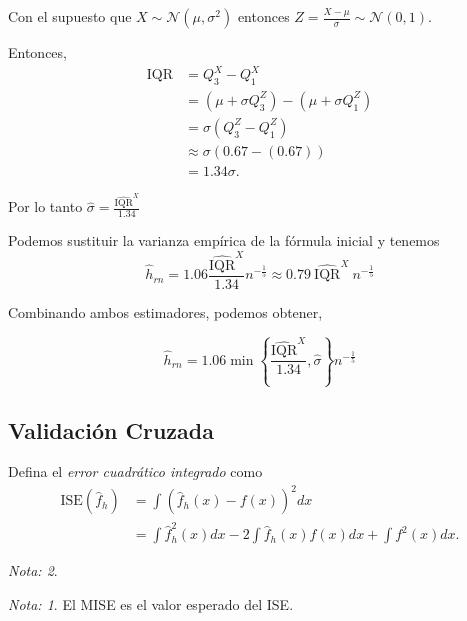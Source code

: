 \documentclass[
  12pt,
]{book}
\theoremstyle{definition}
\theoremstyle{definition}
\theoremstyle{definition}
\theoremstyle{remark}
\newtheorem*{remark}{Nota: }
\begin{document}
Con el supuesto que \(X\sim \mathcal{N}(\mu,\sigma^{2})\) entonces \(\displaystyle Z = \frac{X-\mu}{\sigma} \sim \mathcal{N}(0,1)\).

Entonces,
\begin{align*}
\mathrm{IQR}
& = Q^{X}_{3} - Q^{X}_{1}                                                     \\
& = \left( \mu+\sigma Q^{Z}_{3} \right) - \left( \mu+\sigma Q^{Z}_{1} \right) \\
& = \sigma \left(Q^{Z}_{3} - Q^{Z}_{1} \right)                                \\
& \approx \sigma \left( 0.67 - (0.67) \right)                                 \\
& =1.34 \sigma.
\end{align*}

Por lo tanto \(\displaystyle \hat{\sigma} = \frac{\widehat{\mathrm{IQR}}^{X}}{1.34}\)

Podemos sustituir la varianza empírica de la fórmula inicial y tenemos
\begin{equation*}
\hat{h}_{rn} = 1.06 \frac{\widehat{\mathrm{IQR}}^{X}}{1.34} n^{-\frac{1}{5}} \approx 0.79\  \widehat{\mathrm{IQR}}^{X}\ n^{-\frac{1}{5}}
\end{equation*}

Combinando ambos estimadores, podemos obtener,

\begin{equation*}
\hat{h}_{rn} = 1.06 \min \left\{\frac{\widehat{\mathrm{IQR}}^{X}}{1.34}, \hat{\sigma }\right\} n^{-\frac{1}{5}}
\end{equation*}

\hypertarget{validaciuxf3n-cruzada}{%
\subsection{Validación Cruzada}\label{validaciuxf3n-cruzada}}

Defina el \emph{error cuadrático integrado} como
\begin{align*}
\mathrm{ISE}(\hat{f}_{h}) & =\int\left(\hat{f}_{h}(x)-f(x)\right)^{2}dx\nonumber                   \\
& =\int \hat{f}_{h}^{2}(x)dx-2\int \hat{f}_{h}(x)f(x)dx+\int f^{2}(x)dx.
\end{align*}

\begin{remark}
\begin{remark}

{}El MISE es el valor esperado del ISE.

\end{remark}
\end{remark}
\end{document}
